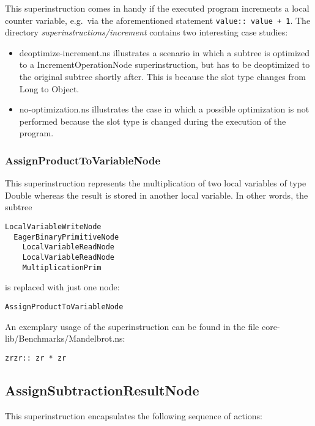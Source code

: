 \documentclass[10pt,a4paper]{article}
\begin{document}
This superinstruction comes in handy if the executed program increments a local counter variable, e.g.\ via the aforementioned statement \verb|value:: value + 1|. The directory \emph{superinstructions/increment} contains two interesting case studies:

\begin{itemize}
	\item \textsf{deoptimize-increment.ns} illustrates a scenario in which a subtree is optimized to a \textsf{IncrementOperationNode} superinstruction, but has to be deoptimized to the original subtree shortly after. This is because the slot type changes from \textsf{Long} to \textsf{Object}.
	\item \textsf{no-optimization.ns} illustrates the case in which a possible optimization is not performed because the slot type is changed during the execution of the program.
\end{itemize}

\subsubsection{AssignProductToVariableNode}

This superinstruction represents the multiplication of two local variables of type \textsf{Double} whereas the result is stored in another local variable. In other words, the subtree

\begin{verbatim}
LocalVariableWriteNode
  EagerBinaryPrimitiveNode
    LocalVariableReadNode
    LocalVariableReadNode
    MultiplicationPrim
\end{verbatim}
is replaced with just one node:
\begin{verbatim}
AssignProductToVariableNode
\end{verbatim}
An exemplary usage of the superinstruction can be found in the file \textsf{core-lib/Benchmarks/Mandelbrot.ns}:
\begin{verbatim}
zrzr:: zr * zr
\end{verbatim}

\subsection{AssignSubtractionResultNode}

This superinstruction encapsulates the following sequence of actions:
\end{document}
